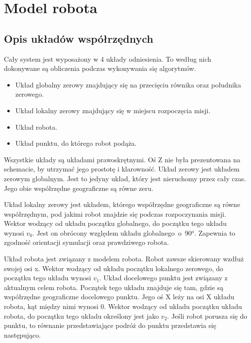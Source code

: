 \newpage
\section{Model robota}\label{robot_model}
{
    \subsection{Opis układów współrzędnych}\label{coordinates}
    {
        Cały system jest wyposażony w 4 układy odniesienia. To według nich dokonywane są obliczenia podczas wykonywania się algorytmów.
        \begin{itemize}
            \item Układ globalny zerowy znajdujący się na przecięciu równika oraz południka zerowego.
            \item Układ lokalny zerowy znajdujący się w miejscu rozpoczęcia misji.
            \item Układ robota.
            \item Układ punktu, do którego robot podąża.
        \end{itemize}
        
        
        \newpage
        
        Wszystkie układy są układami prawoskrętnymi. Oś Z nie była prezentowana na schemacie, by utrzymać jego prostotę i klarowność.
        Układ zerowy jest układem zerowym globalnym. Jest to jedyny układ, który jest nieruchomy przez cały czas.
        Jego obie współrzędne geograficzne są równe zeru.
        
        Układ lokalny zerowy jest układem, którego współrzędne geograficzne są równe współrzędnym, pod jakimi robot znajdzie się podczas rozpoczynania misji. Wektor wodzący od układu początku globalnego, do początku tego układu wynosi $v_0$. Jest on obrócony względem układu globalnego~o~90$^o$. Zapewnia to zgodność orientacji symulacji oraz prawdziwego robota.
        
        Układ robota jest związany z modelem robota. Robot zawsze skierowany wzdłuż swojej osi x. Wektor wodzący od układu początku lokalnego zerowego, do początku tego układu wynosi $v_1$.
        Układ docelowego punktu jest związany z aktualnym celem robota. Początek tego układu znajduje się tam, gdzie są współrzędne geograficzne docelowego punktu. Jego oś X leży na osi X układu robota, kąt między nimi wynosi 0. Wektor wodzący od układu początku układu robota, do początku tego układu określony jest jako $v_2$.
        Jeśli robot porusza się do punktu, to równanie przedstawiające podróż do punktu przedstawia się następująco.
        
}}
